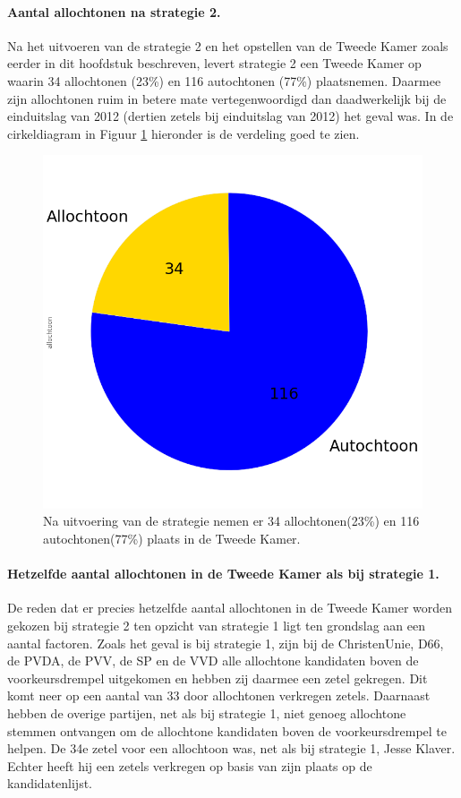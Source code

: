\paragraph{Aantal allochtonen na strategie 2.}
Na het uitvoeren van de strategie 2 en het opstellen van de Tweede Kamer zoals eerder in dit hoofdstuk beschreven, levert strategie 2 een Tweede Kamer op waarin 34 allochtonen (23\%) en 116 autochtonen (77\%) plaatsnemen. Daarmee zijn allochtonen ruim in betere mate vertegenwoordigd dan daadwerkelijk bij de einduitslag van 2012 (dertien zetels bij einduitslag van 2012) het geval was. In de cirkeldiagram in Figuur \ref{fig:pcS2A} hieronder is de verdeling goed te zien. 


\begin{figure}[H]
\centering
	\includegraphics[width=0.35\linewidth]{pie_chart_topN_allochtonen.png}

			\caption{Na uitvoering van de strategie nemen er 34 allochtonen(23\%) en 116 autochtonen(77\%) plaats in de Tweede Kamer.}

\label{fig:pcS2A}
\end{figure}





\paragraph{Hetzelfde aantal allochtonen in de Tweede Kamer als bij strategie 1.}
De reden dat er precies hetzelfde aantal allochtonen in de Tweede Kamer worden gekozen bij strategie 2 ten opzicht van strategie 1 ligt ten grondslag aan een aantal factoren. Zoals het geval is bij strategie 1, zijn bij de ChristenUnie, D66, de PVDA, de PVV, de SP en de VVD alle allochtone kandidaten boven de voorkeursdrempel uitgekomen en hebben zij daarmee een zetel gekregen. Dit komt neer op een aantal van 33 door allochtonen verkregen zetels. Daarnaast hebben de overige partijen, net als bij strategie 1, niet genoeg allochtone stemmen ontvangen om de allochtone kandidaten boven de voorkeursdrempel te helpen. De 34e zetel voor een allochtoon was, net als bij strategie 1, Jesse Klaver. Echter heeft hij een zetels verkregen op basis van zijn plaats op de kandidatenlijst. 



